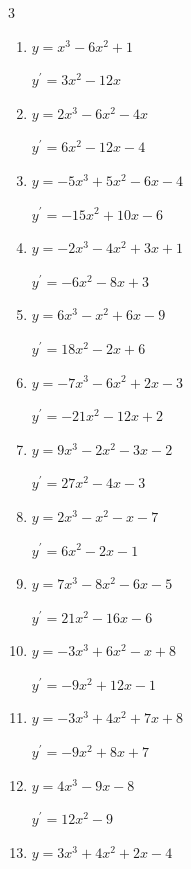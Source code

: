 \begin{multicols}{3}
\begin{enumerate}
  \item $y=x^{3}-6x^{2}+1$

        $\displaystyle y^{\prime}=3x^{2}-12x$

  \item $y=2x^{3}-6x^{2}-4x$

        $\displaystyle y^{\prime}=6x^{2}-12x-4$

  \item $y=-5x^{3}+5x^{2}-6x-4$

        $\displaystyle y^{\prime}=-15x^{2}+10x-6$

  \item $y=-2x^{3}-4x^{2}+3x+1$

        $\displaystyle y^{\prime}=-6x^{2}-8x+3$

  \item $y=6x^{3}-x^{2}+6x-9$

        $\displaystyle y^{\prime}=18x^{2}-2x+6$

  \item $y=-7x^{3}-6x^{2}+2x-3$

        $\displaystyle y^{\prime}=-21x^{2}-12x+2$

\columnbreak %

\resetques

  \item $y=9x^{3}-2x^{2}-3x-2$

        $\displaystyle y^{\prime}=27x^{2}-4x-3$

  \item $y=2x^{3}-x^{2}-x-7$

        $\displaystyle y^{\prime}=6x^{2}-2x-1$

  \item $y=7x^{3}-8x^{2}-6x-5$

        $\displaystyle y^{\prime}=21x^{2}-16x-6$

  \item $y=-3x^{3}+6x^{2}-x+8$

        $\displaystyle y^{\prime}=-9x^{2}+12x-1$

  \item $y=-3x^{3}+4x^{2}+7x+8$

        $\displaystyle y^{\prime}=-9x^{2}+8x+7$

  \item $y=4x^{3}-9x-8$

        $\displaystyle y^{\prime}=12x^{2}-9$

  \item $y=3x^{3}+4x^{2}+2x-4$


\end{enumerate}
\end{multicols}
